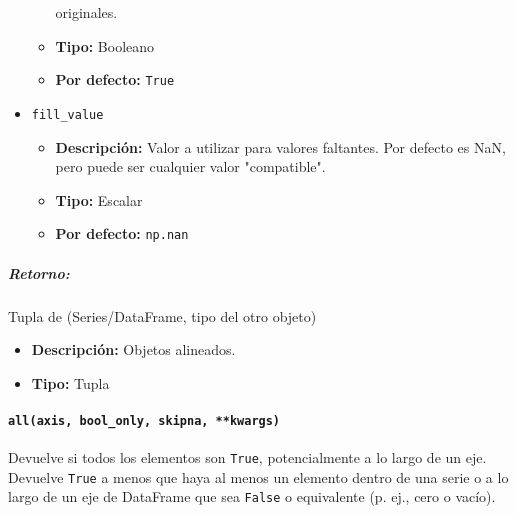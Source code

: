 \begin{itemize}
\begin{itemize}
                    originales.
              \item \textbf{Tipo:} Booleano
              \item \textbf{Por defecto:} \texttt{True}
          \end{itemize}
    \item \texttt{fill\_value}
          \begin{itemize}
              \item \textbf{Descripción:} Valor a utilizar para valores
                    faltantes. Por defecto es NaN, pero puede ser cualquier valor "compatible".
              \item \textbf{Tipo:} Escalar
              \item \textbf{Por defecto:} \texttt{np.nan}
          \end{itemize}
\end{itemize}

\subparagraph{Retorno:} Tupla de (Series/DataFrame, tipo del otro objeto)
\begin{itemize}
    \item \textbf{Descripción:} Objetos alineados.
    \item \textbf{Tipo:} Tupla
\end{itemize}

\paragraph{\texttt{all(axis, bool\_only, skipna, **kwargs)}}
Devuelve si todos los elementos son \texttt{True}, potencialmente a lo largo de
un eje. Devuelve \texttt{True} a menos que haya al menos un elemento dentro de
una serie o a lo largo de un eje de DataFrame que sea \texttt{False} o
equivalente (p. ej., cero o vacío).

